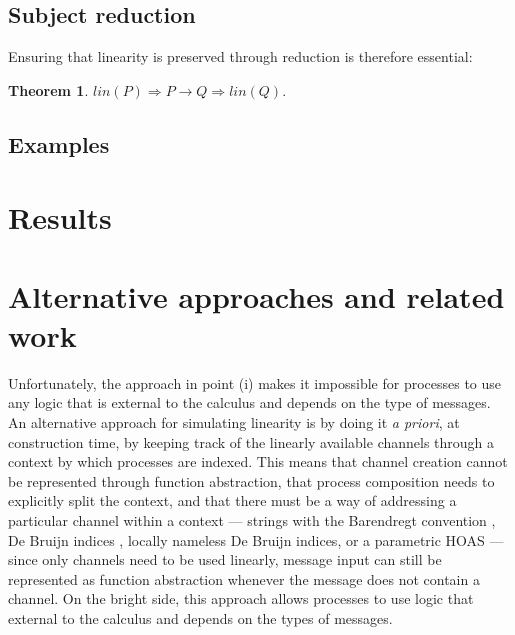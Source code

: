 \documentclass{mproj}
\newtheorem{theorem}{Theorem}
\begin{document}
\section{Subject reduction}\label{subject-reduction}


Ensuring that linearity is preserved through reduction is therefore essential:
\begin{theorem}
    $lin(P) \Rightarrow P \rightarrow Q \Rightarrow lin(Q).$
\end{theorem}

\section{Examples}\label{examples}


\chapter{Results}\label{results}

\chapter{Alternative approaches and related work}\label{related-work}


Unfortunately, the approach in point (i) makes it impossible for processes to use any logic that is external to the calculus and depends on the type of messages. An alternative approach for simulating linearity is by doing it \emph{a priori}, at construction time, by keeping track of the linearly available channels through a context by which processes are indexed.  This means that channel creation cannot be represented through function abstraction, that process composition needs to explicitly split the context, and that there must be a way of addressing a particular channel within a context --- strings with the Barendregt convention \cite{Barendregt1984}, De Bruijn indices \cite{deBruijn1972}, locally nameless De Bruijn indices, or a parametric HOAS \cite{Chlipala2008} --- since only channels need to be used linearly, message input can still be represented as function abstraction whenever the message does not contain a channel. On the bright side, this approach allows processes to use logic that external to the calculus and depends on the types of messages.
\end{document}

